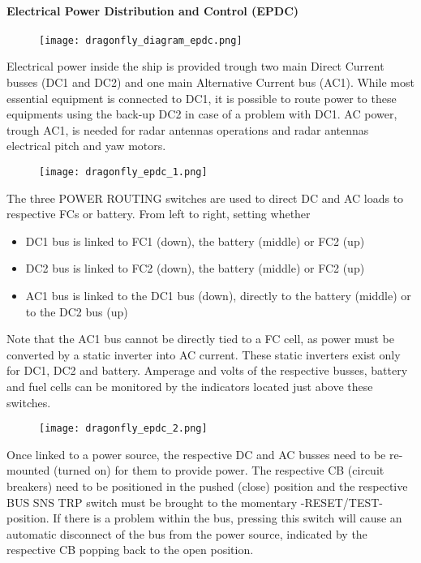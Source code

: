 \documentclass[Orbiter User Manual.tex]{subfiles}
\begin{document}
\paragraph{Electrical Power Distribution and Control (EPDC)}

\begin{figure}[H]
  \centering
  \texttt{[image: dragonfly\_diagram\_epdc.png]}
\end{figure}

\noindent
Electrical power inside the ship is provided trough two main Direct Current busses (DC1 and DC2) and one main Alternative Current bus (AC1). While most essential equipment is connected to DC1, it is possible to route power to these equipments using the back-up DC2 in case of a problem with DC1. AC power, trough AC1, is needed for radar antennas operations and radar antennas electrical pitch and yaw motors.

\begin{figure}[H]
  \centering
  \texttt{[image: dragonfly\_epdc\_1.png]}
\end{figure}

\noindent
The three POWER ROUTING switches are used to direct DC and AC loads to respective FCs or battery. From left to right, setting whether

\begin{itemize}
\item DC1 bus is linked to FC1 (down), the battery (middle) or FC2 (up)
\item DC2 bus is linked to FC2 (down), the battery (middle) or FC2 (up)
\item AC1 bus is linked to the DC1 bus (down), directly to the battery (middle) or to the DC2 bus (up)
\end{itemize}

\noindent
Note that the AC1 bus cannot be directly tied to a FC cell, as power must be converted by a static inverter into AC current. These static inverters exist only for DC1, DC2 and battery. Amperage and volts of the respective busses, battery and fuel cells can be monitored by the indicators located just above these switches.

\begin{figure}[H]
  \centering
  \texttt{[image: dragonfly\_epdc\_2.png]}
\end{figure}

\noindent
Once linked to a power source, the respective DC and AC busses need to be re-mounted (turned on) for them to provide power. The respective CB (circuit breakers) need to be positioned in the pushed (close) position and the respective BUS SNS TRP switch must be brought to the momentary -RESET/TEST- position. If there is a problem within the bus, pressing this switch will cause an automatic disconnect of the bus from the power source, indicated by the respective CB popping back to the open position.
\end{document}
